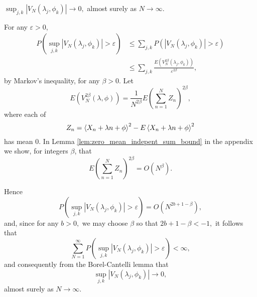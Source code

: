 \begin{lemma} \label{lem:supVjk}
$\sup_{j,k}\left\vert V_{N}\left(  \lambda_{j},\phi_{k}\right)  \right\vert
\rightarrow0,$ almost surely as $N\rightarrow\infty.$
\end{lemma}

\begin{IEEEproof}
For any $\varepsilon>0$,
\begin{align*}
P\left(  \sup_{j,k}\left\vert V_{N}\left(  \lambda_{j},\phi_{k}\right)
\right\vert >\varepsilon\right)   &  \leq\sum_{j,k}P\left(  \left\vert
V_{N}\left(  \lambda_{j},\phi_{k}\right)  \right\vert >\varepsilon\right) \\
&  \leq\sum_{j,k}\frac{E\left(  V_{N}^{2\beta}\left(  \lambda_{j},\phi
_{k}\right)  \right)  }{\varepsilon^{2\beta}},
\end{align*}
by Markov's inequality, for any $\beta>0.$ Let%
\[
E\left(  V_{N}^{2\beta}\left(  \lambda,\phi\right)  \right)  =\frac
{1}{N^{2\beta}}E\left(  \sum_{n=1}^{N}Z_{n}\right)  ^{2\beta},
\]
where each of%
\[
Z_{n}=\fracpart{  X_{n}+\lambda n+\phi }  ^{2}-E\fracpart{  X_{n}+\lambda
n+\phi }  ^{2}%
\]
has mean $0$. In Lemma \ref{lem:zero_mean_indepent_sum_bound} in the appendix we show, for integers $\beta$, that
\begin{equation}
E\left(  \sum_{n=1}^{N}Z_{n}\right)  ^{2\beta}= O\left(N^\beta\right) . 
\label{eq:markapp}%
\end{equation}

Hence%
\[
P\left(  \sup_{j,k}\left\vert V_{N}\left(  \lambda_{j},\phi_{k}\right)
\right\vert >\varepsilon\right)  =O\left(  N^{2b+1-\beta}\right)  ,
\]
and, since for any $b>0,$ we may choose $\beta$ so that $2b+1-\beta<-1,$ it
follows that
\[
\sum_{N=1}^{\infty}P\left(  \sup_{j,k}\left\vert V_{N}\left(  \lambda_{j}%
,\phi_{k}\right)  \right\vert >\varepsilon\right)  <\infty,
\]
and consequently from the Borel-Cantelli lemma that%
\[
\sup_{j,k}\left\vert V_{N}\left(  \lambda_{j},\phi_{k}\right)  \right\vert
\rightarrow 0,
\]
almost surely as $N\rightarrow\infty.$
\end{IEEEproof}

